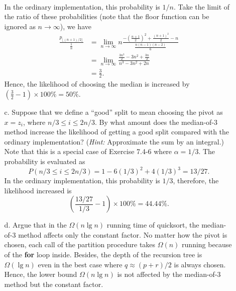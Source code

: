 \documentclass[12pt,reqno]{amsart}
\newif\ifanswer
\begin{document}
\begin{enumerate}[1.]
\begin{enumerate}
\begin{align*}
    \end{align*}
    In the ordinary implementation, this probability is $1/n$. Take the limit of the ratio of these probabilities (note that the floor function can be ignored as $n\to\infty$), we have
    \begin{align*}
        \frac{p_{\lfloor(n + 1)/2\rfloor}}{\frac{1}{n}} &= \lim_{n\to\infty}n\frac{-\left(\frac{n + 1}{2}\right)^2 + \frac{(n + 1)^2}{2} - n}{\frac{n(n - 1)(n - 2)}{6}}\\
        &= \lim_{n\to\infty}\frac{\frac{3n^3}{2} - 3n^2 + \frac{3n}{2}}{n^3 - 3n^2 + 2n}\\
        &= \frac{3}{2}.
    \end{align*}
    Hence, the likelihood of choosing the median is increased by $\left(\frac{3}{2} - 1\right) \times 100\% = 50\%$.
    \item[c.] Suppose that we define a ``good'' split to mean choosing the pivot as $x = z_i$, where $n/3 \leq i \leq 2n/3$. By what amount does the median-of-3 method increase the likelihood of getting a good split compared with the ordinary implementation? (\textit{Hint:} Approximate the sum by an integral.)
    \ifanswer
    \noindent {\bf \\Solution}
    Note that this is a special case of Exercise 7.4-6 where $\alpha = 1/3$. The probability is evaluated as
    $$
    P(n/3 \leq i \leq 2n/3) = 1 - 6(1/3)^2 + 4(1/3)^3 = 13/27.
    $$
    In the ordinary implementation, this probability is $1/3$, therefore, the likelihood increased is
    $$
    \left(\frac{13/27}{1/3} - 1\right) \times 100\% = 44.44\%.
    $$
    \item[d.] Argue that in the $\Omega(n\lg{n})$ running time of quicksort, the median-of-3 method affects only the constant factor.
    \ifanswer
    \noindent {\bf \\Solution}
    No matter how the pivot is chosen, each call of the partition procedure takes $\Omega(n)$ running because of the \textbf{for} loop inside. Besides, the depth of the recursion tree is $\Omega(\lg{n})$ even in the best case where $q \approx (p + r)/2$ is always chosen. Hence, the lower bound $\Omega(n\lg{n})$ is not affected by the median-of-3 method but the constant factor.

\end{enumerate}
\end{enumerate}
\end{document}
